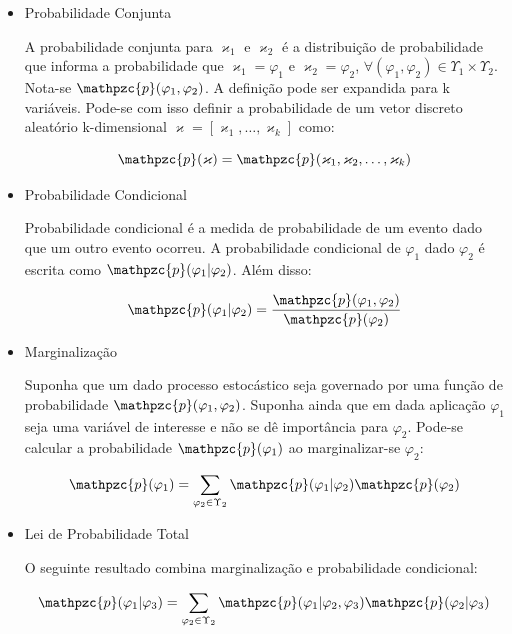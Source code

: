 {\begin{itemize}
\item Probabilidade Conjunta

A probabilidade conjunta para $\varkappa_1$ e $\varkappa_2$ é a distribuição de probabilidade que informa a probabilidade que $\varkappa_1 = \varphi_1$ e $\varkappa_2 = \varphi_2$, $\forall (\varphi_1, \varphi_2) \in \Upsilon_1 \times \Upsilon_2$. Nota-se $\mathpzc{p}(\varphi_1, \varphi_2)$. A definição pode ser expandida para k variáveis. Pode-se com isso definir a probabilidade de um vetor discreto aleatório k-dimensional $\mathbf{\varkappa} = [\varkappa_1, \ldots, \varkappa_k]$ como:

\begin{equation}
\mathpzc{p}(\mathbf{\varkappa}) = \mathpzc{p}(\varkappa_1, \varkappa_2, \ldots, \varkappa_k) 
\end{equation}

\item Probabilidade Condicional

Probabilidade condicional é a medida de probabilidade de um evento dado que um outro evento ocorreu. A probabilidade condicional de $\varphi_1$ dado $\varphi_2$ é escrita como $\mathpzc{p}(\varphi_1 | \varphi_2)$. Além disso:

\begin{equation}
\mathpzc{p}(\varphi_1 | \varphi_2) = \frac{\mathpzc{p}(\varphi_1, \varphi_2)}{\mathpzc{p}(\varphi_2)}
\end{equation}


\item Marginalização

Suponha que um dado processo estocástico seja governado por uma função de probabilidade $\mathpzc{p}(\varphi_1,\varphi_2)$.  Suponha ainda que em dada aplicação $\varphi_1$ seja uma variável de interesse e não se dê importância para $\varphi_2$. Pode-se calcular a probabilidade $\mathpzc{p}(\varphi_1)$ ao marginalizar-se $\varphi_2$:

\begin{equation}
\mathpzc{p}(\varphi_1) = \sum_{\varphi_2 \in \Upsilon_2} \mathpzc{p}(\varphi_1|\varphi_2)\mathpzc{p}(\varphi_2)
\end{equation}

\item Lei de Probabilidade Total

O seguinte resultado combina marginalização e probabilidade condicional:

\begin{equation}
\mathpzc{p}(\varphi_1|\varphi_3) = \sum_{\varphi_2 \in \Upsilon_2} \mathpzc{p}(\varphi_1|\varphi_2, \varphi_3)\mathpzc{p}(\varphi_2|\varphi_3)
\end{equation}


\end{itemize}}

